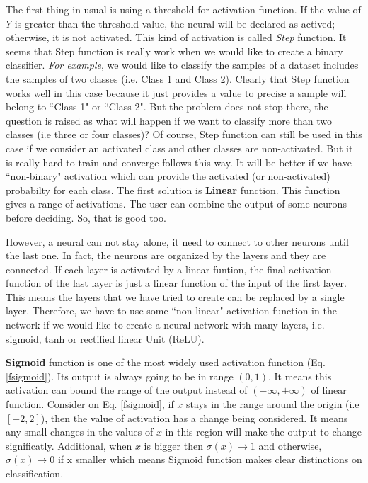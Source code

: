 The first thing in usual is using a threshold for activation function. If the value of $Y$ is greater than the threshold value, the neural will be declared as actived; otherwise, it is not activated. This kind of activation is called \textit{Step} function. It seems that Step function is really work when we would like to create a binary classifier. \textit{For example}, we would like to classify the samples of a dataset includes the samples of two classes (i.e. Class 1 and Class 2). Clearly that Step function works well in this case because it just provides a value to precise a sample will belong to ``Class 1" or ``Class 2". But the problem does not stop there, the question is raised as what will happen if we want to classify more than two classes (i.e three or four classes)? Of course, Step function can still be used in this case if we consider an activated class and other classes are non-activated. But it is really hard to train and converge follows this way. It will be better if we have ``non-binary" activation which can provide the activated (or non-activated) probabilty for each class. The first solution is \textbf{Linear} function. This function gives a range of activations. The user can combine the output of some neurons before deciding. So, that is good too.

However, a neural can not stay alone, it need to connect to other neurons until the last one. In fact, the neurons are organized by the layers and they are connected. If each layer is activated by a linear funtion, the final activation function of the last layer is  just a linear function of the input of the first layer. This means the layers that we have tried to create can be replaced by a single layer. Therefore, we have to use some ``non-linear" activation function in the network if we would like to create a neural network with many layers, i.e. sigmoid, tanh or rectified linear Unit (ReLU).

\textbf{Sigmoid} function is one of the most widely used activation function (Eq. \ref{fsigmoid}). Its output is always going to be in range $(0,1)$.  It means this activation can bound the range of the output instead of $(-\infty, +\infty )$ of linear function. Consider on Eq. \ref{fsigmoid}, if $x$ stays in the range around the origin (i.e $[-2,2]$), then the value of activation has a change being considered. It means any small changes in the values of $x$ in this region will make the output to change significatly. Additional, when $x$ is bigger then $\sigma(x) \rightarrow 1$ and otherwise, $\sigma(x) \rightarrow 0$ if x smaller which means Sigmoid function makes clear distinctions on classification.


